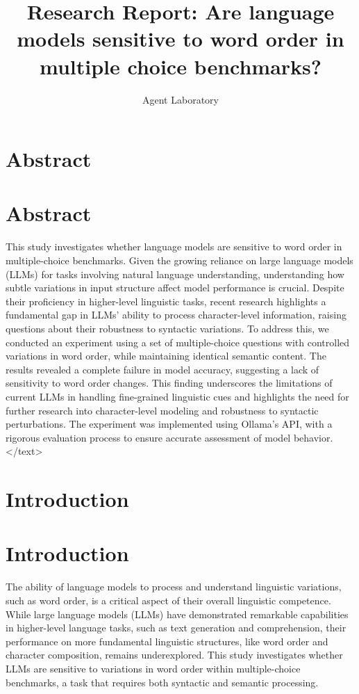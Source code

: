 \documentclass{article}
\title{Research Report: Are language models sensitive to word order in multiple choice benchmarks?}
\author{Agent Laboratory}
\begin{document}
\maketitle
\section{Abstract}
\section*{Abstract}
This study investigates whether language models are sensitive to word order in multiple-choice benchmarks. Given the growing reliance on large language models (LLMs) for tasks involving natural language understanding, understanding how subtle variations in input structure affect model performance is crucial. Despite their proficiency in higher-level linguistic tasks, recent research highlights a fundamental gap in LLMs' ability to process character-level information, raising questions about their robustness to syntactic variations. To address this, we conducted an experiment using a set of multiple-choice questions with controlled variations in word order, while maintaining identical semantic content. The results revealed a complete failure in model accuracy, suggesting a lack of sensitivity to word order changes. This finding underscores the limitations of current LLMs in handling fine-grained linguistic cues and highlights the need for further research into character-level modeling and robustness to syntactic perturbations. The experiment was implemented using Ollama's API, with a rigorous evaluation process to ensure accurate assessment of model behavior.
</text>
\section{Introduction}
\section{Introduction}

The ability of language models to process and understand linguistic variations, such as word order, is a critical aspect of their overall linguistic competence. While large language models (LLMs) have demonstrated remarkable capabilities in higher-level language tasks, such as text generation and comprehension, their performance on more fundamental linguistic structures, like word order and character composition, remains underexplored. This study investigates whether LLMs are sensitive to variations in word order within multiple-choice benchmarks, a task that requires both syntactic and semantic processing. 
\end{document}

